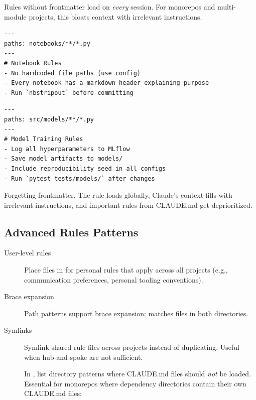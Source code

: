 Rules without  frontmatter load on \emph{every} session.
For monorepos and multi-module projects, this bloats context with
irrelevant instructions.

\begin{verbatim}
---
paths: notebooks/**/*.py
---
# Notebook Rules
- No hardcoded file paths (use config)
- Every notebook has a markdown header explaining purpose
- Run `nbstripout` before committing
\end{verbatim}

\begin{verbatim}
---
paths: src/models/**/*.py
---
# Model Training Rules
- Log all hyperparameters to MLflow
- Save model artifacts to models/
- Include reproducibility seed in all configs
- Run `pytest tests/models/` after changes
\end{verbatim}

\begin{warnbox}
Forgetting  frontmatter. The rule loads globally,
Claude's context fills with irrelevant instructions, and important
rules from CLAUDE.md get deprioritized.
\end{warnbox}

\subsection{Advanced Rules Patterns}


\begin{description}
  \item[User-level rules] Place  files in
     for personal rules that apply across all projects
    (e.g., communication preferences, personal tooling conventions).
  \item[Brace expansion] Path patterns support brace expansion:
     matches files in both directories.
  \item[Symlinks] Symlink shared rule files across projects instead of duplicating.
    Useful when hub-and-spoke  are not sufficient.
  \item[] In , list directory patterns
    where CLAUDE.md files should \emph{not} be loaded. Essential for monorepos
    where dependency directories contain their own CLAUDE.md files:
\end{description}

